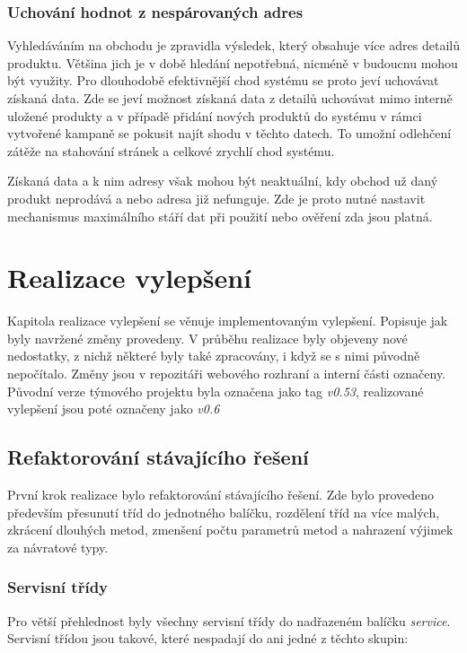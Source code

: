 \documentclass[thesis=B,czech]{FITthesis}[2012/06/26]
\begin{document}
\subsection{Uchování hodnot z nespárovaných adres}
Vyhledáváním na obchodu je zpravidla výsledek, který obsahuje více adres detailů produktu. Většina jich je v době hledání nepotřebná, nicméně v budoucnu mohou být využity. Pro dlouhodobě 
efektivnější chod systému se proto jeví uchovávat získaná data. Zde se jeví možnost získaná data z detailů uchovávat mimo interně uložené produkty
a v případě přidání nových produktů do systému v rámci vytvořené kampaně se pokusit najít shodu v těchto datech. To umožní odlehčení zátěže
na stahování stránek a celkové zrychlí chod systému.
\par
Získaná data a k nim adresy však mohou být neaktuální, kdy obchod už daný produkt neprodává a nebo adresa již nefunguje. Zde je proto nutné
nastavit mechanismus maximálního stáří dat při použití nebo ověření zda jsou platná.


\chapter{Realizace vylepšení}
Kapitola realizace vylepšení se věnuje implementovaným vylepšení. Popisuje jak byly navržené změny provedeny.
V průběhu realizace byly objeveny nové nedostatky, z nichž některé byly také zpracovány, i když se s nimi původně nepočítalo.
Změny jsou v repozitáři webového rozhraní a interní části označeny. Původní verze týmového projektu byla označena jako
tag \textit{v0.53}, realizované vylepšení jsou poté označeny jako \textit{v0.6}

\section{Refaktorování stávajícího řešení}
První krok realizace bylo refaktorování stávajícího řešení. Zde bylo provedeno především přesunutí tříd do jednotného balíčku, 
rozdělení tříd na více malých, zkrácení dlouhých metod, zmenšení počtu parametrů metod a nahrazení výjimek za návratové typy.

\subsection{Servisní třídy}
Pro větší přehlednost byly všechny servisní třídy do nadřazeném balíčku \textit{service}. 
Servisní třídou jsou takové, které nespadají do ani jedné z těchto skupin:
\end{document}
